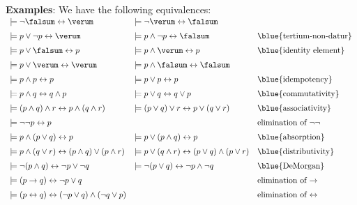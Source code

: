 \noindent
\textbf{Examples}:  We have the following equivalences: \\[0.3cm]
\hspace*{0.3cm} 
$\begin{array}{lll}
\models \neg \falsum \leftrightarrow \verum & \models \neg \verum \leftrightarrow \falsum &  \\[0.2cm]
 \models p \vee   \neg p \leftrightarrow \verum & \models p \wedge \neg p \leftrightarrow \falsum & \mbox{\blue{tertium-non-datur}} \\[0.2cm]
 \models p \vee   \falsum \leftrightarrow p & \models p \wedge \verum  \leftrightarrow p & \mbox{\blue{identity element}}\\[0.2cm]
 \models p \vee   \verum  \leftrightarrow \verum & \models p \wedge \falsum \leftrightarrow \falsum &  \\[0.2cm]
 \models p \wedge p \leftrightarrow p  & \models p \vee p \leftrightarrow p &  \mbox{\blue{idempotency}}\index{idempotency} \\[0.2cm]
 \models p \wedge q \leftrightarrow q \wedge p & \models p \vee   q \leftrightarrow q \vee p & \mbox{\blue{commutativity}}\index{commutative} \\[0.2cm]
 \models (p \wedge q) \wedge r \leftrightarrow p \wedge (q \wedge r) & \models (p \vee   q) \vee r \leftrightarrow p \vee   (q \vee r)  &
 \mbox{\blue{associativity}}\index{associative} \\[0.2cm]
 \models \neg \neg p \leftrightarrow p & & \mbox{elimination of $\neg \neg$} \\[0.2cm]
 \models p \wedge (p \vee q)   \leftrightarrow p & \models p \vee   (p \wedge q) \leftrightarrow p &  \mbox{\blue{absorption}}\index{absorption} \\[0.2cm]
 \models p \wedge (q \vee r)   \leftrightarrow (p \wedge q) \vee   (p \wedge r) & 
 \models p \vee   (q \wedge r) \leftrightarrow (p \vee q)   \wedge (p \vee   r) & \mbox{\blue{distributivity}}\index{distributive} \\[0.2cm]
 \models \neg (p \wedge q) \leftrightarrow  \neg p \vee   \neg q &  \models \neg (p \vee   q) \leftrightarrow  \neg p \wedge \neg q &
 \mbox{\blue{DeMorgan}}\index{DeMorgan rules}  \\[0.2cm]
 \models (p \rightarrow q) \leftrightarrow \neg p \vee q & &  \mbox{elimination of $\rightarrow$} \\[0.2cm]
 \models (p \leftrightarrow q) \leftrightarrow (\neg p \vee q) \wedge (\neg q \vee p) & & \mbox{elimination of $\leftrightarrow$}
\end{array}$ \\[0.3cm]

